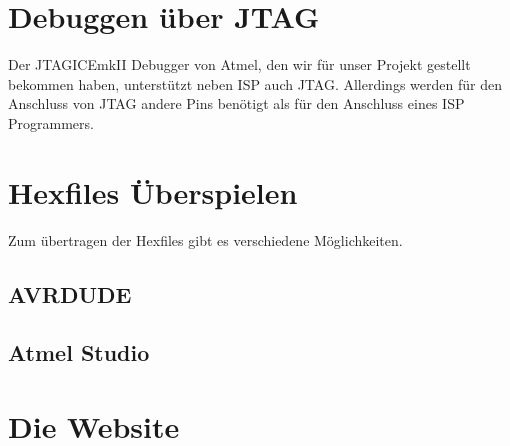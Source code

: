 \section{Debuggen über JTAG}

Der JTAGICEmkII Debugger von Atmel, den wir für unser Projekt gestellt bekommen
haben, unterstützt neben ISP auch JTAG. Allerdings werden für den Anschluss von
JTAG andere Pins benötigt als für den Anschluss eines ISP Programmers.


\section{Hexfiles Überspielen}

Zum übertragen der Hexfiles gibt es verschiedene Möglichkeiten.

\subsection{AVRDUDE}



\subsection{Atmel Studio}

\section{Die Website}
